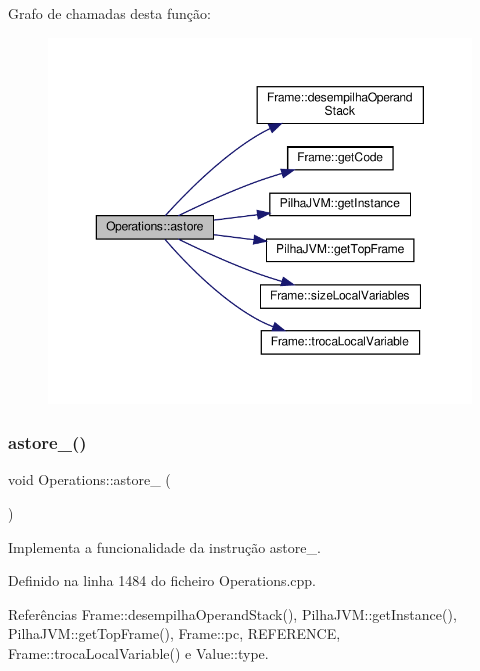 Grafo de chamadas desta função\+:
\nopagebreak
\begin{figure}[H]
\begin{center}
\leavevmode
\includegraphics[width=350pt]{classOperations_aa414424bd203fb9788712fd2e74c3a32_cgraph}
\end{center}
\end{figure}
\mbox{\label{classOperations_a140f2e8501424f8a73dbfecfa3ca859f}} 
\subsubsection{\texorpdfstring{astore\+\_()}{astore\_0()}}
{\footnotesize\ttfamily void Operations\+::astore\+\_ (\begin{DoxyParamCaption}{ }\end{DoxyParamCaption})\hspace{0.3cm}{\ttfamily [private]}}



Implementa a funcionalidade da instrução astore\+\_. 



Definido na linha 1484 do ficheiro Operations.\+cpp.



Referências Frame\+::desempilha\+Operand\+Stack(), Pilha\+J\+V\+M\+::get\+Instance(), Pilha\+J\+V\+M\+::get\+Top\+Frame(), Frame\+::pc, R\+E\+F\+E\+R\+E\+N\+CE, Frame\+::troca\+Local\+Variable() e Value\+::type.



